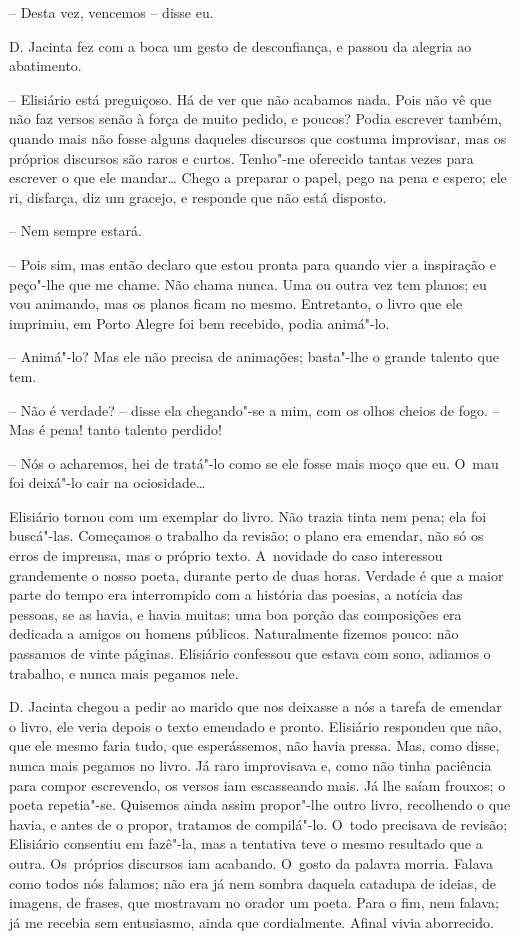 -- Desta vez, vencemos -- disse eu.

D. Jacinta fez com a boca um gesto de desconfiança, e passou da alegria
ao abatimento.

-- Elisiário está preguiçoso. Há de ver que não acabamos nada. Pois não
vê que não faz versos senão à força de muito pedido, e poucos? Podia
escrever também, quando mais não fosse alguns daqueles discursos que
costuma improvisar, mas os próprios discursos são raros e curtos.
Tenho"-me oferecido tantas vezes para escrever o que ele mandar\ldots{} Chego
a preparar o papel, pego na pena e espero; ele ri, disfarça, diz um
gracejo, e responde que não está disposto.

-- Nem sempre estará.

-- Pois sim, mas então declaro que estou pronta para quando vier a
inspiração e peço"-lhe que me chame. Não chama nunca. Uma ou outra vez
tem planos; eu vou animando, mas os planos ficam no mesmo. Entretanto, o
livro que ele imprimiu, em Porto Alegre foi bem recebido, podia
animá"-lo.

-- Animá"-lo? Mas ele não precisa de animações; basta"-lhe o grande
talento que tem.

-- Não é verdade? -- disse ela chegando"-se a mim, com os olhos cheios de
fogo. -- Mas é pena! tanto talento perdido!

-- Nós o acharemos, hei de tratá"-lo como se ele fosse mais moço que eu.
O~mau foi deixá"-lo cair na ociosidade\ldots{}

Elisiário tornou com um exemplar do livro. Não trazia tinta nem pena;
ela foi buscá"-las. Começamos o trabalho da revisão; o plano era emendar,
não só os erros de imprensa, mas o próprio texto. A~novidade do caso
interessou grandemente o nosso poeta, durante perto de duas horas.
Verdade é que a maior parte do tempo era interrompido com a história das
poesias, a notícia das pessoas, se as havia, e havia muitas; uma boa
porção das composições era dedicada a amigos ou homens públicos.
Naturalmente fizemos pouco: não passamos de vinte páginas. Elisiário
confessou que estava com sono, adiamos o trabalho, e nunca mais pegamos
nele.

D. Jacinta chegou a pedir ao marido que nos deixasse a nós a tarefa de
emendar o livro, ele veria depois o texto emendado e pronto. Elisiário
respondeu que não, que ele mesmo faria tudo, que esperássemos, não havia
pressa. Mas, como disse, nunca mais pegamos no livro. Já raro
improvisava e, como não tinha paciência para compor escrevendo, os
versos iam escasseando mais. Já lhe saíam frouxos; o poeta repetia"-se.
Quisemos ainda assim propor"-lhe outro livro, recolhendo o que havia, e
antes de o propor, tratamos de compilá"-lo. O~todo precisava de revisão;
Elisiário consentiu em fazê"-la, mas a tentativa teve o mesmo resultado
que a outra. Os~próprios discursos iam acabando. O~gosto da palavra
morria. Falava como todos nós falamos; não era já nem sombra daquela
catadupa de ideias, de imagens, de frases, que mostravam no orador um
poeta. Para o fim, nem falava; já me recebia sem entusiasmo, ainda que
cordialmente. Afinal vivia aborrecido.

